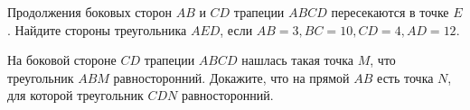 \documentclass{article}
\begin{document}
\begin{enumerate_boxed}
        \item Продолжения боковых сторон $AB$ и $CD$ трапеции $ABCD$ пересекаются в точке $E$.
        Найдите стороны треугольника $AED$, если
        $AB = 3, BC = 10, CD = 4, AD = 12$.

        \item На боковой стороне $CD$ трапеции $ABCD$ нашлась такая точка $M$, что треугольник $ABM$ равносторонний.
        Докажите, что на прямой $AB$ есть точка $N$, для которой треугольник $CDN$ равносторонний.

    \end{enumerate_boxed}
\end{document}
